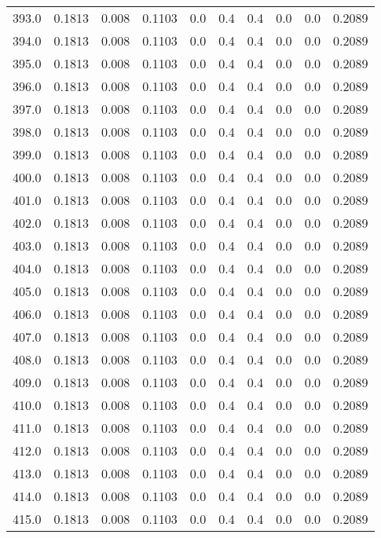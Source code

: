 \begin{longtable}{lrrrrrrrrr}
393.0 & 0.1813 & 0.008 & 0.1103 & 0.0 & 0.4 & 0.4 & 0.0 & 0.0 & 0.2089 \\
394.0 & 0.1813 & 0.008 & 0.1103 & 0.0 & 0.4 & 0.4 & 0.0 & 0.0 & 0.2089 \\
395.0 & 0.1813 & 0.008 & 0.1103 & 0.0 & 0.4 & 0.4 & 0.0 & 0.0 & 0.2089 \\
396.0 & 0.1813 & 0.008 & 0.1103 & 0.0 & 0.4 & 0.4 & 0.0 & 0.0 & 0.2089 \\
397.0 & 0.1813 & 0.008 & 0.1103 & 0.0 & 0.4 & 0.4 & 0.0 & 0.0 & 0.2089 \\
398.0 & 0.1813 & 0.008 & 0.1103 & 0.0 & 0.4 & 0.4 & 0.0 & 0.0 & 0.2089 \\
399.0 & 0.1813 & 0.008 & 0.1103 & 0.0 & 0.4 & 0.4 & 0.0 & 0.0 & 0.2089 \\
400.0 & 0.1813 & 0.008 & 0.1103 & 0.0 & 0.4 & 0.4 & 0.0 & 0.0 & 0.2089 \\
401.0 & 0.1813 & 0.008 & 0.1103 & 0.0 & 0.4 & 0.4 & 0.0 & 0.0 & 0.2089 \\
402.0 & 0.1813 & 0.008 & 0.1103 & 0.0 & 0.4 & 0.4 & 0.0 & 0.0 & 0.2089 \\
403.0 & 0.1813 & 0.008 & 0.1103 & 0.0 & 0.4 & 0.4 & 0.0 & 0.0 & 0.2089 \\
404.0 & 0.1813 & 0.008 & 0.1103 & 0.0 & 0.4 & 0.4 & 0.0 & 0.0 & 0.2089 \\
405.0 & 0.1813 & 0.008 & 0.1103 & 0.0 & 0.4 & 0.4 & 0.0 & 0.0 & 0.2089 \\
406.0 & 0.1813 & 0.008 & 0.1103 & 0.0 & 0.4 & 0.4 & 0.0 & 0.0 & 0.2089 \\
407.0 & 0.1813 & 0.008 & 0.1103 & 0.0 & 0.4 & 0.4 & 0.0 & 0.0 & 0.2089 \\
408.0 & 0.1813 & 0.008 & 0.1103 & 0.0 & 0.4 & 0.4 & 0.0 & 0.0 & 0.2089 \\
409.0 & 0.1813 & 0.008 & 0.1103 & 0.0 & 0.4 & 0.4 & 0.0 & 0.0 & 0.2089 \\
410.0 & 0.1813 & 0.008 & 0.1103 & 0.0 & 0.4 & 0.4 & 0.0 & 0.0 & 0.2089 \\
411.0 & 0.1813 & 0.008 & 0.1103 & 0.0 & 0.4 & 0.4 & 0.0 & 0.0 & 0.2089 \\
412.0 & 0.1813 & 0.008 & 0.1103 & 0.0 & 0.4 & 0.4 & 0.0 & 0.0 & 0.2089 \\
413.0 & 0.1813 & 0.008 & 0.1103 & 0.0 & 0.4 & 0.4 & 0.0 & 0.0 & 0.2089 \\
414.0 & 0.1813 & 0.008 & 0.1103 & 0.0 & 0.4 & 0.4 & 0.0 & 0.0 & 0.2089 \\
415.0 & 0.1813 & 0.008 & 0.1103 & 0.0 & 0.4 & 0.4 & 0.0 & 0.0 & 0.2089 \\

\end{longtable}
